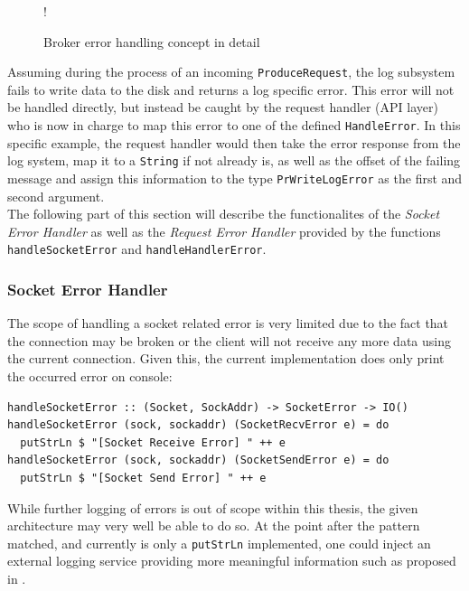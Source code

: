 \begin{figure}[H]
  \centering
   {!} {
    
  }
  \caption{Broker error handling concept in detail}
  \label{fig:broker-error-activity-detail}
\end{figure}

Assuming during the process of an incoming \lstinline{ProduceRequest}, the log
subsystem fails to write data to the disk and returns a log specific error. This
error will not be handled directly, but instead be caught by the request handler
(API layer) who is now in charge to map this error to one of the defined
\lstinline{HandleError}. In this specific example, the request handler would
then take the error response from the log system, map it to a \lstinline{String}
if not already is, as well as the offset of the failing message and assign this
information to the type \lstinline{PrWriteLogError} as the first and second
argument. \\

The following part of this section will describe the functionalites of the
\textit{Socket Error Handler} as well as the \textit{Request Error Handler}
provided by the functions \lstinline{handleSocketError} and
\lstinline{handleHandlerError}.

\subsubsection{Socket Error Handler}

The scope of handling a socket related error is very limited due to the fact
that the connection may be broken or the client will not receive any more data
using the current connection. Given this, the current implementation does only
print the occurred error on console:

\begin{lstlisting}[caption={Catching error of type SocketError}]
handleSocketError :: (Socket, SockAddr) -> SocketError -> IO()
handleSocketError (sock, sockaddr) (SocketRecvError e) = do
  putStrLn $ "[Socket Receive Error] " ++ e
handleSocketError (sock, sockaddr) (SocketSendError e) = do
  putStrLn $ "[Socket Send Error] " ++ e
\end{lstlisting}

While further logging of errors is out of scope within this thesis, the given
architecture may very well be able to do so. At the point after the pattern
matched, and currently is only a \lstinline{putStrLn} implemented, one
could inject an external logging service providing more meaningful information
such as proposed in .

